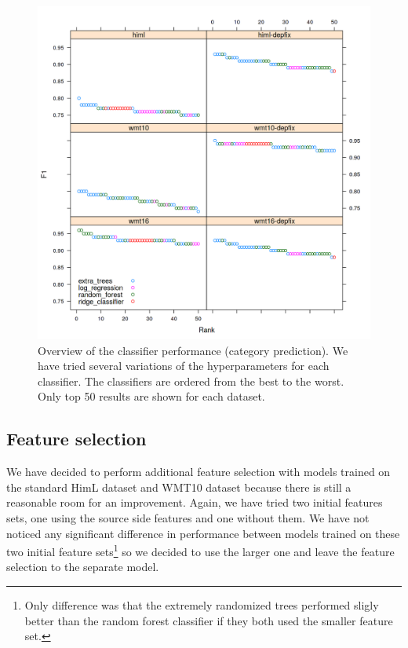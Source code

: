 \begin{figure}
\centering
  \includegraphics[scale=0.7]{cat-class}
  \caption{
    Overview of the classifier performance (category prediction).
We have tried several variations of the hyperparameters
for each classifier. The classifiers are ordered from the best to the worst. Only top 50 results
are shown for each dataset.
}
  \label{cats-draft}
\end{figure}

\subsection{Feature selection}

We have decided to perform additional feature selection with models trained on the standard HimL dataset
and WMT10 dataset because there is still a reasonable room for an improvement. Again, we have tried two initial features
sets, one using the source side features and one without them. We have not noticed any significant difference in performance
between models trained on these two initial feature sets\footnote{Only difference was that the extremely randomized
trees performed sligly better than the random forest classifier if they both used the smaller feature set.} so we decided to use the larger one and leave
the feature selection to the separate model.

